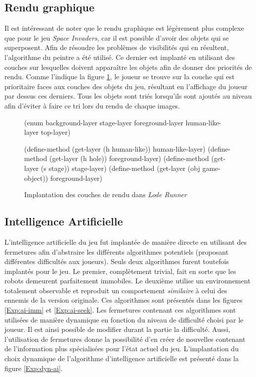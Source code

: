 \documentclass[12pt,twoside,letterpaper,francais]{book}
\newcommand{\scheme}[1]{\selectlanguage{english}{\tt #1}\selectlanguage{french}}
\begin{document}
\subsection{Rendu graphique}
Il est intéressant de noter que le rendu graphique est légèrement plus
complexe que pour le jeu \textit{Space Invaders}, car il est possible d'avoir des objets
qui se superposent. Afin de résoudre les problèmes de visibilités qui
en résultent, l'algorithme du peintre a été utilisé. Ce dernier est
implanté en utilisant des couches sur lesquelles doivent apparaître
les objets afin de donner des priorités de rendu. Comme l'indique la
figure \ref{Exp:layers}, le joueur se trouve sur la couche
\scheme{human-like-layer} qui est prioritaire faces aux couches des
objets du jeu, résultant en l'affichage du joueur par dessus ces
derniers. Tous les objets sont triés lorsqu'ils sont ajoutés au niveau
afin d'éviter à faire ce tri lors du rendu de chaque images.\\

\begin{figure}[htb!]
  \begin{schemecode}
(enum background-layer stage-layer foreground-layer 
      human-like-layer top-layer)

(define-method (get-layer (h human-like))    human-like-layer)
(define-method (get-layer (h hole))          foreground-layer)
(define-method (get-layer (s stage))         stage-layer)
(define-method (get-layer (obj game-object)) foreground-layer)
  \end{schemecode}
  \caption{Implantation des couches de rendu dans \textit{Lode Runner}}
  \label{Exp:layers}
\end{figure}


\FloatBarrier
\subsection{Intelligence Artificielle}
L'intelligence artificielle du jeu fut implantée de manière directe en
utilisant des fermetures afin d'abstraire les différents algorithmes
potentiels (proposant différentes difficultés aux joueurs). Seuls deux
algorithmes furent toutefois implantés pour le jeu. Le premier,
complètement trivial, fait en sorte que les robots demeurent
parfaitement immobiles.  Le deuxième utilise un environnement
totalement observable et reproduit un comportement \emph{similaire} à
celui des ennemis de la version originale. Ces algorithmes sont
présentés dans les figures \ref{Exp:ai-imm} et \ref{Exp:ai-seek}. Les
fermetures contenant ces algorithmes sont utilisées de manière
dynamique en fonction du niveau de difficulté choisi par le joueur. Il
est ainsi possible de modifier durant la partie la difficulté. Aussi,
l'utilisation de fermetures donne la possibilité d'en créer de
nouvelles contenant de l'information plus spécialisées pour l'état
actuel du jeu. L'implantation du choix dynamique de l'algorithme
d'intelligence artificielle est présenté dans la figure
\ref{Exp:dyn-ai}.\\
\end{document}
